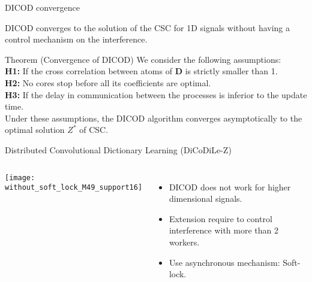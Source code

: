 \documentclass[main_dicodile]{subfiles}
\begin{document}
\begin{frame}{DICOD convergence }

DICOD converges to the solution of the CSC for 1D signals without having a control mechanism on the interference.\\[1em]

\begin{beamerboxesrounded}[upper=my title,lower=my body,shadow=true]{
        Theorem (Convergence of DICOD)}
    We consider the following assumptions:\\[.3em]
    {\bf H1: }
    If the cross correlation between atoms of $\pmb D$ is strictly smaller than 1.\\[.3em]
    {\bf H2: }
    No cores stop before all its coefficients are optimal.\\[.3em]
    {\bf H3: }
    If the delay in communication between the processes is inferior to the update time.\\[1em]
    Under these assumptions, the DICOD algorithm converges asymptotically to the
    optimal solution $Z^*$ of CSC.
\end{beamerboxesrounded}

\end{frame}

\begin{frame}{Distributed Convolutional Dictionary Learning (DiCoDiLe-Z)\\}

\begin{columns}[c]
    \texttt{[image: without\_soft\_lock\_M49\_support16]}
    \begin{itemize}[<+->]\itemsep1em
        \item DICOD does not work for higher dimensional signals.
        \item Extension require to control interference with more than 2 workers. 
        \item Use asynchronous mechanism: Soft-lock.
    \end{itemize}
\end{columns}

\end{frame}
\end{document}

